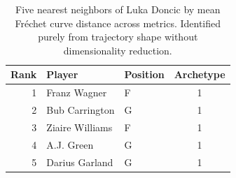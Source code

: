 \begin{table}[htbp]
  \centering\small
  \begin{tabular}{rllc}
    \toprule
    Rank & Player & Position & Archetype \\
    \midrule
    1 & Franz Wagner & F & 1 \\
    2 & Bub Carrington & G & 1 \\
    3 & Ziaire Williams & F & 1 \\
    4 & A.J. Green & G & 1 \\
    5 & Darius Garland & G & 1 \\
    \bottomrule
  \end{tabular}
  \caption{Five nearest neighbors of Luka Doncic by mean Fr\'{e}chet curve distance across metrics. Identified purely from trajectory shape without dimensionality reduction.}
  \label{tab:Luka_Doncic_frechet_curve_neighbors}
\end{table}

